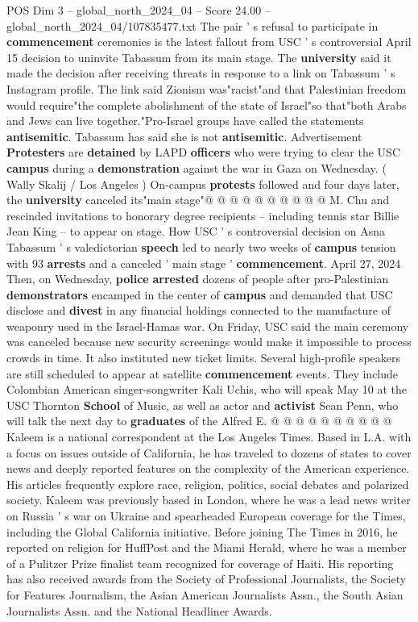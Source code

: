 \begin{textsample}{POS Dim 3 – global\_north\_2024\_04 – Score 24.00 – global\_north\_2024\_04/107835477.txt}
The pair ' s refusal to participate in \textbf{commencement} ceremonies is the latest fallout from USC ' s controversial April 15 decision to uninvite Tabassum from its main stage.
The \textbf{university} said it made the decision after receiving threats in response to a link on Tabassum ' s Instagram profile.
The link said Zionism was"racist"and that Palestinian freedom would require"the complete abolishment of the state of Israel"so that"both Arabs and Jews can live together."Pro-Israel groups have called the statements \textbf{antisemitic}.
Tabassum has said she is not \textbf{antisemitic}.
Advertisement \textbf{Protesters} are \textbf{detained} by LAPD \textbf{officers} who were trying to clear the USC \textbf{campus} during a \textbf{demonstration} against the war in Gaza on Wednesday. ( Wally Skalij / Los Angeles ) On-campus \textbf{protests} followed and four days later, the \textbf{university} canceled its"main stage"@ @ @ @ @ @ @ @ @ @ M.
Chu and rescinded invitations to honorary degree recipients -- including tennis star Billie Jean King -- to appear on stage.
How USC ' s controversial decision on Asna Tabassum ' s valedictorian \textbf{speech} led to nearly two weeks of \textbf{campus} tension with 93 \textbf{arrests} and a canceled ' main stage ' \textbf{commencement}.
April 27, 2024 Then, on Wednesday, \textbf{police} \textbf{arrested} dozens of people after pro-Palestinian \textbf{demonstrators} encamped in the center of \textbf{campus} and demanded that USC disclose and \textbf{divest} in any financial holdings connected to the manufacture of weaponry used in the Israel-Hamas war.
On Friday, USC said the main ceremony was canceled because new security screenings would make it impossible to process crowds in time.
It also instituted new ticket limits.
Several high-profile speakers are still scheduled to appear at satellite \textbf{commencement} events.
They include Colombian American singer-songwriter Kali Uchis, who will speak May 10 at the USC Thornton \textbf{School} of Music, as well as actor and \textbf{activist} Sean Penn, who will talk the next day to \textbf{graduates} of the Alfred E. @ @ @ @ @ @ @ @ @ @ Kaleem is a national correspondent at the Los Angeles Times.
Based in L.A. with a focus on issues outside of California, he has traveled to dozens of states to cover news and deeply reported features on the complexity of the American experience.
His articles frequently explore race, religion, politics, social debates and polarized society.
Kaleem was previously based in London, where he was a lead news writer on Russia ' s war on Ukraine and spearheaded European coverage for the Times, including the Global California initiative.
Before joining The Times in 2016, he reported on religion for HuffPost and the Miami Herald, where he was a member of a Pulitzer Prize finalist team recognized for coverage of Haiti.
His reporting has also received awards from the Society of Professional Journalists, the Society for Features Journalism, the Asian American Journalists Assn., the South Asian Journalists Assn. and the National Headliner Awards.


\end{textsample}
